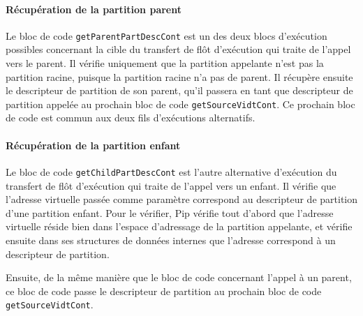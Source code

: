 
		\paragraph{Récupération de la partition parent}

		Le bloc de code \texttt{getParentPartDescCont} est un des deux blocs d'exécution possibles concernant la cible du transfert de flôt d'exécution qui traite de l'appel vers le parent. Il vérifie uniquement que la partition appelante n'est pas la partition racine, puisque la partition racine n'a pas de parent. Il récupère ensuite le descripteur de partition de son parent, qu'il passera en tant que descripteur de partition appelée au prochain bloc de code \texttt{getSourceVidtCont}. Ce prochain bloc de code est commun aux deux fils d'exécutions alternatifs.


		\paragraph{Récupération de la partition enfant}

		Le bloc de code \texttt{getChildPartDescCont} est l'autre alternative d'exécution du transfert de flôt d'exécution qui traite de l'appel vers un enfant. Il vérifie que l'adresse virtuelle passée comme paramètre correspond au descripteur de partition d'une partition enfant. Pour le vérifier, Pip vérifie tout d'abord que l'adresse virtuelle réside bien dans l'espace d'adressage de la partition appelante, et vérifie ensuite dans ses structures de données internes que l'adresse correspond à un descripteur de partition.

		Ensuite, de la même manière que le bloc de code concernant l'appel à un parent, ce bloc de code passe le descripteur de partition au prochain bloc de code \texttt{getSourceVidtCont}.


